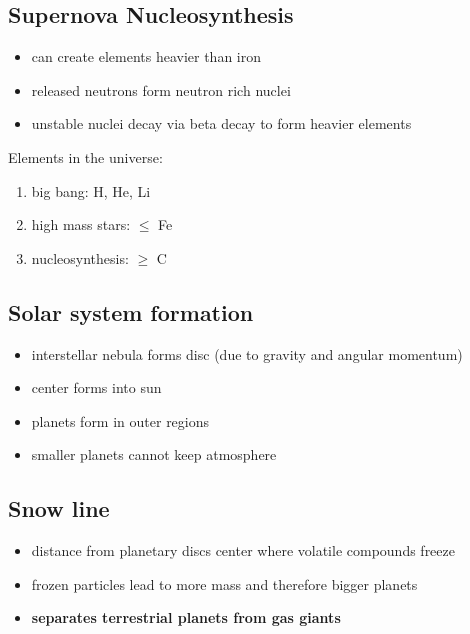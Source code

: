 \documentclass{article}
\theoremstyle{sltheorem}
\begin{document}
\subsection{Supernova Nucleosynthesis}
\begin{itemize}
    \item can create elements heavier than iron
    \item released neutrons form neutron rich nuclei
    \item unstable nuclei decay via beta decay to form heavier elements
\end{itemize}
Elements in the universe:
\begin{enumerate}
    \item big bang: H, He, Li
    \item high mass stars: $\leq$ Fe
    \item nucleosynthesis: $\geq$ C
\end{enumerate}
\subsection{Solar system formation}
\begin{itemize}
    \item interstellar nebula forms disc (due to gravity and angular momentum)
    \item center forms into sun
    \item planets form in outer regions
    \item smaller planets cannot keep atmosphere
\end{itemize}
\subsection{Snow line}
\begin{itemize}
    \item distance from planetary discs center where volatile compounds freeze
    \item frozen particles lead to more mass and therefore bigger planets
    \item \textbf{separates terrestrial planets from gas giants}
\end{itemize}
\end{document}
